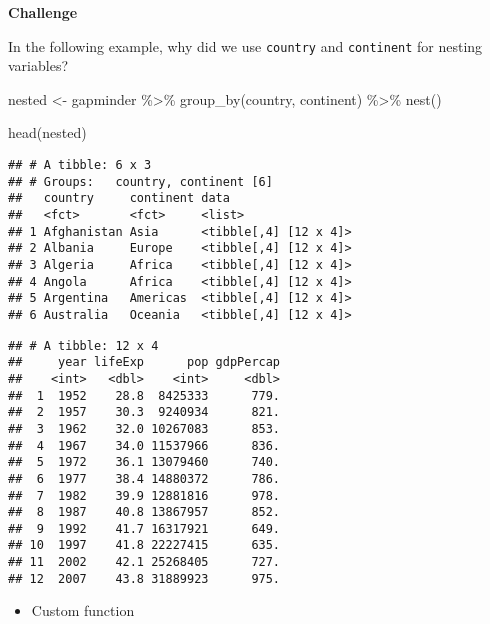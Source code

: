 \documentclass[
]{book}
\newenvironment{Shaded}{\begin{snugshade}}{\end{snugshade}}
\newcommand{\DecValTok}[1]{\textcolor[rgb]{0.00,0.00,0.81}{#1}}
\newcommand{\FunctionTok}[1]{\textcolor[rgb]{0.00,0.00,0.00}{#1}}
\newcommand{\NormalTok}[1]{#1}
\newcommand{\OtherTok}[1]{\textcolor[rgb]{0.56,0.35,0.01}{#1}}
\newcommand{\SpecialCharTok}[1]{\textcolor[rgb]{0.00,0.00,0.00}{#1}}
\providecommand{\tightlist}{%
  \setlength{\itemsep}{0pt}\setlength{\parskip}{0pt}}
\begin{document}
\textbf{Challenge}

In the following example, why did we use \texttt{country} and \texttt{continent} for nesting variables?

\begin{Shaded}
\begin{Highlighting}[]
\NormalTok{nested }\OtherTok{\textless{}{-}}\NormalTok{ gapminder }\SpecialCharTok{\%\textgreater{}\%}
  \FunctionTok{group\_by}\NormalTok{(country, continent) }\SpecialCharTok{\%\textgreater{}\%}
  \FunctionTok{nest}\NormalTok{()}

\FunctionTok{head}\NormalTok{(nested)}
\end{Highlighting}
\end{Shaded}

\begin{verbatim}
## # A tibble: 6 x 3
## # Groups:   country, continent [6]
##   country     continent data                 
##   <fct>       <fct>     <list>               
## 1 Afghanistan Asia      <tibble[,4] [12 x 4]>
## 2 Albania     Europe    <tibble[,4] [12 x 4]>
## 3 Algeria     Africa    <tibble[,4] [12 x 4]>
## 4 Angola      Africa    <tibble[,4] [12 x 4]>
## 5 Argentina   Americas  <tibble[,4] [12 x 4]>
## 6 Australia   Oceania   <tibble[,4] [12 x 4]>
\end{verbatim}

\begin{Shaded}
\end{Shaded}

\begin{verbatim}
## # A tibble: 12 x 4
##     year lifeExp      pop gdpPercap
##    <int>   <dbl>    <int>     <dbl>
##  1  1952    28.8  8425333      779.
##  2  1957    30.3  9240934      821.
##  3  1962    32.0 10267083      853.
##  4  1967    34.0 11537966      836.
##  5  1972    36.1 13079460      740.
##  6  1977    38.4 14880372      786.
##  7  1982    39.9 12881816      978.
##  8  1987    40.8 13867957      852.
##  9  1992    41.7 16317921      649.
## 10  1997    41.8 22227415      635.
## 11  2002    42.1 25268405      727.
## 12  2007    43.8 31889923      975.
\end{verbatim}

\begin{itemize}
\tightlist
\item
  Custom function
\end{itemize}
\end{document}
